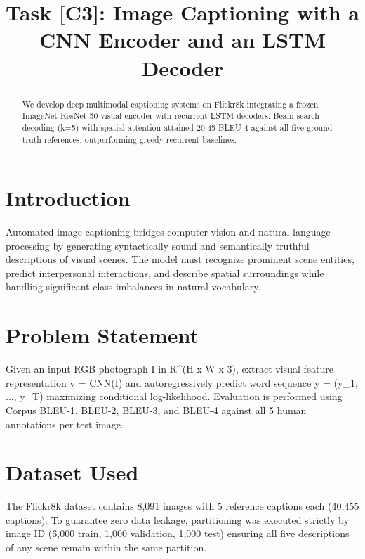 \documentclass[conference]{IEEEtran}
\begin{document}
\title{Task [C3]: Image Captioning with a CNN Encoder and an LSTM Decoder}

\author{
}

\maketitle

\begin{abstract}
We develop deep multimodal captioning systems on Flickr8k integrating a frozen ImageNet ResNet-50 visual encoder with recurrent LSTM decoders. Beam search decoding (k=5) with spatial attention attained 20.45 BLEU-4 against all five ground truth references, outperforming greedy recurrent baselines.
\end{abstract}

\section{Introduction}
Automated image captioning bridges computer vision and natural language processing by generating syntactically sound and semantically truthful descriptions of visual scenes. The model must recognize prominent scene entities, predict interpersonal interactions, and describe spatial surroundings while handling significant class imbalances in natural vocabulary.

\section{Problem Statement}
Given an input RGB photograph I in R^(H x W x 3), extract visual feature representation v = CNN(I) and autoregressively predict word sequence y = (y_1, ..., y_T) maximizing conditional log-likelihood. Evaluation is performed using Corpus BLEU-1, BLEU-2, BLEU-3, and BLEU-4 against all 5 human annotations per test image.

\section{Dataset Used}
The Flickr8k dataset contains 8,091 images with 5 reference captions each (40,455 captions). To guarantee zero data leakage, partitioning was executed strictly by image ID (6,000 train, 1,000 validation, 1,000 test) ensuring all five descriptions of any scene remain within the same partition.
\end{document}

